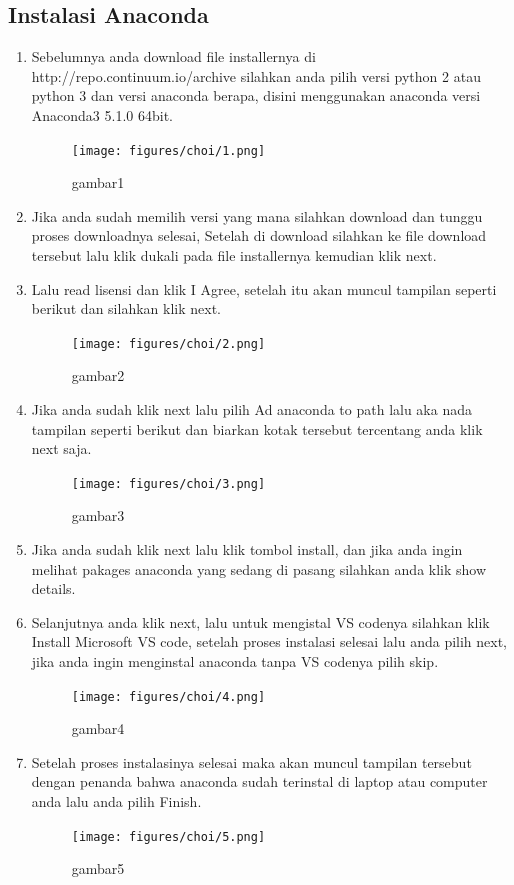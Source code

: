 \subsection{Instalasi Anaconda}
\begin{enumerate}
    \item Sebelumnya anda download file installernya di http://repo.continuum.io/archive silahkan anda pilih versi python 2 atau python 3 dan versi anaconda berapa, disini menggunakan anaconda versi Anaconda3 5.1.0 64bit.
    \begin{figure}[!htbp]
        \centering
        \texttt{[image: figures/choi/1.png]}
        \caption{gambar1}
        \label{gambar pertama}
        \end{figure}

    \item Jika anda sudah memilih versi yang mana silahkan download dan tunggu proses downloadnya selesai, Setelah di download silahkan ke file download tersebut lalu klik dukali pada file installernya kemudian klik next.
    \item Lalu read lisensi dan klik I Agree, setelah itu akan muncul tampilan seperti berikut dan silahkan klik next.
    \begin{figure}[!htbp]
        \centering
        \texttt{[image: figures/choi/2.png]}
        \caption{gambar2}
        \label{gambar kedua}
        \end{figure}

    \item Jika anda sudah klik next lalu pilih Ad anaconda to path lalu aka nada tampilan seperti berikut dan biarkan kotak tersebut tercentang anda klik next saja.
    \begin{figure}[!htbp]
        \centering
        \texttt{[image: figures/choi/3.png]}
        \caption{gambar3}
        \label{gambar ketiga}
        \end{figure}
    \item Jika anda sudah klik next lalu klik tombol install, dan jika anda ingin melihat pakages anaconda yang sedang di pasang silahkan anda klik show details.
    \item Selanjutnya anda klik next, lalu untuk mengistal VS codenya silahkan klik Install Microsoft VS code, setelah proses instalasi selesai lalu anda pilih next, jika anda ingin menginstal anaconda tanpa VS codenya pilih skip.
    \begin{figure}[!htbp]
        \centering
        \texttt{[image: figures/choi/4.png]}
        \caption{gambar4}
        \label{gambar ke empat}
        \end{figure}

    \item Setelah proses instalasinya selesai maka akan muncul tampilan tersebut dengan penanda bahwa anaconda sudah terinstal di laptop atau computer anda lalu anda pilih Finish.
    \begin{figure}[!htbp]
        \centering
        \texttt{[image: figures/choi/5.png]}
        \caption{gambar5}
        \label{gambar kelima}
        \end{figure}
\end{enumerate}

